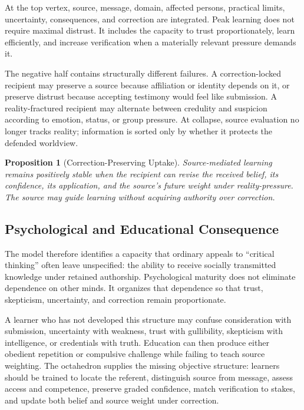 \documentclass[11pt]{article}
\newtheorem{proposition}{Proposition}
\begin{document}
At the top vertex, source, message, domain, affected persons, practical limits, uncertainty, consequences, and correction are integrated. Peak learning does not require maximal distrust. It includes the capacity to trust proportionately, learn efficiently, and increase verification when a materially relevant pressure demands it.

The negative half contains structurally different failures. A correction-locked recipient may preserve a source because affiliation or identity depends on it, or preserve distrust because accepting testimony would feel like submission. A reality-fractured recipient may alternate between credulity and suspicion according to emotion, status, or group pressure. At collapse, source evaluation no longer tracks reality; information is sorted only by whether it protects the defended worldview.

\begin{proposition}[Correction-Preserving Uptake]
Source-mediated learning remains positively stable when the recipient can revise the received belief, its confidence, its application, and the source's future weight under reality-pressure. The source may guide learning without acquiring authority over correction.
\end{proposition}

\subsection{Psychological and Educational Consequence}

The model therefore identifies a capacity that ordinary appeals to ``critical thinking'' often leave unspecified: the ability to receive socially transmitted knowledge under retained authorship. Psychological maturity does not eliminate dependence on other minds. It organizes that dependence so that trust, skepticism, uncertainty, and correction remain proportionate.

A learner who has not developed this structure may confuse consideration with submission, uncertainty with weakness, trust with gullibility, skepticism with intelligence, or credentials with truth. Education can then produce either obedient repetition or compulsive challenge while failing to teach source weighting. The octahedron supplies the missing objective structure: learners should be trained to locate the referent, distinguish source from message, assess access and competence, preserve graded confidence, match verification to stakes, and update both belief and source weight under correction.
\end{document}
